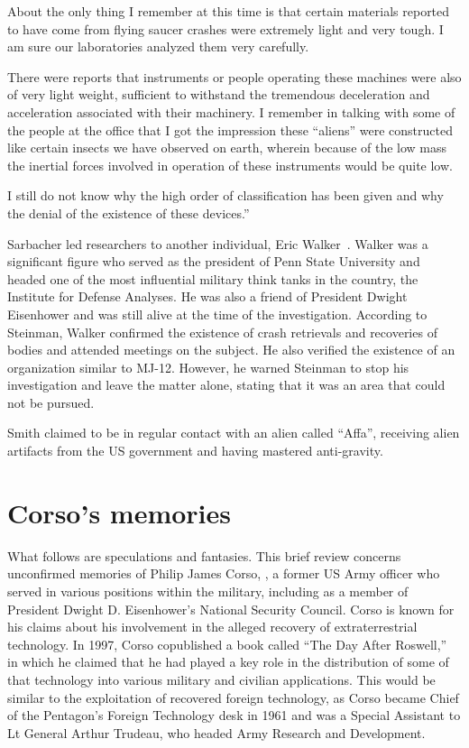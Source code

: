 \begin{svgraybox}
About the only thing I remember at this time is that certain materials reported to have
come from flying saucer crashes were extremely light and very tough. I am sure our
laboratories analyzed them very carefully.

There were reports that instruments or people operating these machines were also of
very light weight, sufficient to withstand the tremendous deceleration and acceleration
associated with their machinery. I remember in talking with some of the people at the
office that I got the impression these ``aliens'' were constructed like certain insects we
have observed on earth, wherein because of the low mass the inertial forces involved in
operation of these instruments would be quite low.

I still do not know why the high order of classification has been given and why the
denial of the existence of these devices.''
\end{svgraybox}

Sarbacher led researchers to another individual,  Eric Walker~\cite{DolanDisclosure2019Mar}.
Walker was a significant figure who served as the president of Penn State University and headed one of the most influential military
think tanks in the country, the Institute for Defense Analyses. He was also a friend of President Dwight Eisenhower and was still alive at the time of the investigation. According to Steinman, Walker confirmed the existence of crash retrievals and recoveries of bodies and attended meetings on the subject. He also verified the existence of an organization similar to MJ-12. However, he warned Steinman to stop his investigation and leave the matter alone, stating that it was an area that could not be pursued.

Smith claimed to be in regular contact with an alien called ``Affa'', receiving alien artifacts from the US government and having mastered anti-gravity.

\section{Corso's memories}
\label{2023-UFO-part-Perception-crash-retreivals-CM}

What follows are speculations and fantasies. This brief review concerns unconfirmed memories of Philip James Corso, , a former US Army officer who served in various positions within the military, including as a member of President Dwight D. Eisenhower's National Security Council. Corso is known for his claims about his involvement in the alleged recovery of extraterrestrial technology. In 1997, Corso copublished a book called ``The Day After Roswell,''~\cite{Corso1998Jun} in which he claimed that he had played a key role in the distribution of some of that technology into various military and civilian applications. This would be similar to the exploitation of recovered foreign technology, as Corso became Chief of the Pentagon's Foreign Technology desk in 1961 and was a Special Assistant to Lt General Arthur Trudeau, who headed Army Research and Development.

